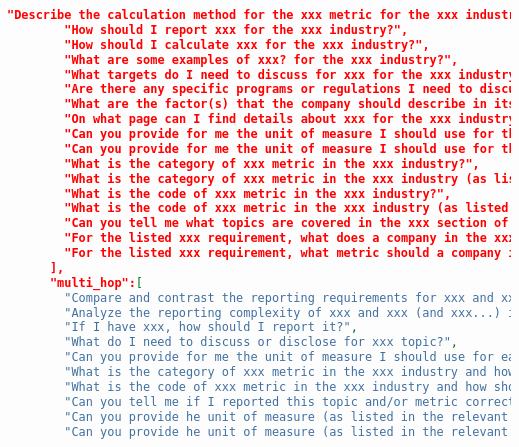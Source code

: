\begin{appendices}
\begin{lstlisting}[language=json,firstnumber=1,label={lst:qa_structures},caption={User-representative sample questions for `CoT + Few-shot' question generation}]
        "Describe the calculation method for the xxx metric for the xxx industry.",
        "How should I report xxx for the xxx industry?",
        "How should I calculate xxx for the xxx industry?",
        "What are some examples of xxx? for the xxx industry?",
        "What targets do I need to discuss for xxx for the xxx industry?",
        "Are there any specific programs or regulations I need to discuss for the xxx industry? Which ones?",
        "What are the factor(s) that the company should describe in its approach and strategy to xxx, according to the xxx metrics for the xxx industry?",
        "On what page can I find details about xxx for the xxx industry?",
        "Can you provide for me the unit of measure I should use for the xxx metric in the xxx industry?",
        "Can you provide for me the unit of measure I should use for the xxx metric in the xxx industry (as listed in the relevant table)?",
        "What is the category of xxx metric in the xxx industry?",
        "What is the category of xxx metric in the xxx industry (as listed in the relevant table)?",
        "What is the code of xxx metric in the xxx industry?",
        "What is the code of xxx metric in the xxx industry (as listed in the relevant table)?",
        "Can you tell me what topics are covered in the xxx section of the xxx document?",
        "For the listed xxx requirement, what does a company in the xxx industry need to do?",
        "For the listed xxx requirement, what metric should a company in the xxx industry use for xxx?"
      ],
      "multi_hop":[
        "Compare and contrast the reporting requirements for xxx and xxx topics in the xxx industry.",
        "Analyze the reporting complexity of xxx and xxx (and xxx...) industries by comparing the number of required metrics.",  
        "If I have xxx, how should I report it?",
        "What do I need to discuss or disclose for xxx topic?",
        "Can you provide for me the unit of measure I should use for each of the metrics for 'xxx' topic(s) in the xxx industry?",
        "What is the category of xxx metric in the xxx industry and how should this metric be calculated?",
        "What is the code of xxx metric in the xxx industry and how should this metric be calculated?",
        "Can you tell me if I reported this topic and/or metric correctly for the xxx industry?",
        "Can you provide he unit of measure (as listed in the relevant table) for all the metrics for xxx topic(s) in the xxx industry?",
        "Can you provide he unit of measure (as listed in the relevant table) for all the metrics for xxx topic(s) in the xxx industry and how should these metrics be calculated?",

\end{lstlisting}
\end{appendices}
